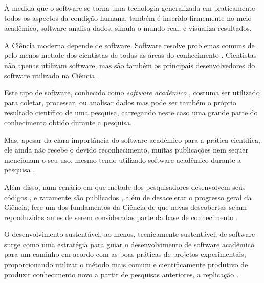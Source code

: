 {À medida que o software se torna uma tecnologia generalizada em praticamente
todos os aspectos da condição humana, também é inserido firmemente no meio
acadêmico, software analisa dados, simula o mundo real, e visualiza
resultados.}

A Ciência moderna depende de software. Software resolve problemas comuns de
pelo menos metade dos cientistas de todas as áreas do conhecimento
\cite{wilson2014best}. Cientistas não apenas utilizam software, mas são também
os principais desenvolvedores do software utilizado na Ciência
\cite{goble2014better}.

Este tipo de software, conhecido como {\it software acadêmico}
\cite{allen2017engineering}, costuma ser utilizado para coletar, processar, ou
analisar dados mas pode ser também o próprio resultado científico de uma
pesquisa, carregando neste caso uma grande parte do conhecimento obtido durante
a pesquisa.


Mas, apesar da clara importância do software acadêmico para a prática
científica, ele ainda não recebe o devido reconhecimento, muitas publicações
nem sequer mencionam o seu uso, mesmo tendo utilizado software acadêmico
durante a pesquisa \cite{momcheva2015software, howison2016software}.

Além disso, num cenário em que metade dos pesquisadores desenvolvem seus
códigos \cite{hettrick2014uk}, e raramente são publicados
\cite{robles2010replicating, amann2015software}, além de desacelerar o
progresso geral da Ciência, fere um dos fundamentos da Ciência de que novas
descobertas sejam reproduzidas antes de serem consideradas parte da base de
conhecimento \cite{stodden2009enabling}.

O desenvolvimento sustentável, ao menos, tecnicamente sustentável, de software
surge como uma estratégia para guiar o desenvolvimento de software acadêmico
para um caminho em acordo com as boas práticas de projetos experimentais,
proporcionando utilizar o método mais comum e cientificamente produtivo de
produzir conhecimento novo a partir de pesquisas anteriores, a replicação
\cite{king1995replication, stodden2010reproducible}.


